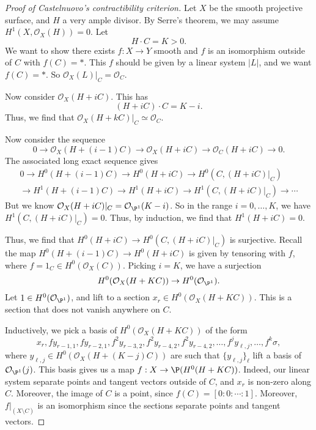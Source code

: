\documentclass[a4paper]{article}
\begin{document}
\begin{proof}[Proof of Castelnuovo's contractibility criterion]
  Let $X$ be the smooth projective surface, and $H$ a very ample divisor. By Serre's theorem, we may assume $H^1(X, \mathcal{O}_X(H)) = 0$. Let
  \[
    H \cdot C = K > 0.
  \]
  We want to show there exists $f: X \to Y$ smooth and $f$ is an isomorphism outside of $C$ with $f(C) = *$. This $f$ should be given by a linear system $|L|$, and we want $f(C) = *$. So $\mathcal{O}_X(L)|_C = \mathcal{O}_C$.

  Now consider $\mathcal{O}_X(H + iC)$. This has
  \[
    (H + iC) \cdot C = K - i.
  \]
  Thus, we find that $\mathcal{O}_X(H + kC)|_C \simeq \mathcal{O}_C$.

  Now consider the sequence
  \[
    0 \to \mathcal{O}_X (H + (i - 1) C) \to \mathcal{O}_X(H + iC) \to \mathcal{O}_C(H + iC) \to 0.
  \]
  The associated long exact sequence gives
  \begin{multline*}
    0 \to H^0(H + (i - 1)C) \to H^0(H + iC) \to H^0(C, (H + iC)|_C)\\
    \to H^1(H + (i - 1)C) \to H^1(H + iC) \to H^1(C, (H + iC)|_C) \to \cdots
  \end{multline*}
  But we know $\mathcal{O}_X(H + iC)|_C = \mathcal{O}_{\P^1}(K - i)$. So in the range $i = 0, \ldots, K$, we have $H^1(C, (H + iC)|_C) = 0$. Thus, by induction, we find that $H^1(H + iC) = 0$.

  Thus, we find that $H^0(H + iC) \to H^0(C, (H + iC)|_C)$ is surjective. Recall the map $H^0(H + (i - 1)C) \to H^0(H + iC)$ is given by tensoring with $f$, where $f = 1_C \in H^0(\mathcal{O}_X(C))$. Picking $i = K$, we have a surjection
  \[
    H^0(\mathcal{O}_X(H + KC)) \to H^0(\mathcal{O}_{\P^1}).
  \]
  Let $1 \in H^0(\mathcal{O}_{\P^1})$, and lift to a section $x_r \in H^0(\mathcal{O}_X(H + KC))$. This is a section that does not vanish anywhere on $C$.

  Inductively, we pick a basis of $H^0(\mathcal{O}_X(H + KC))$ of the form
  \[
    x_r, f y_{r - 1, 1}, f y_{r - 2, 1}, f^2 y_{r - 3, 2}, f^2 y_{r - 4, 2}, f^2 y_{r - 4, 2}, \ldots, f^j y_{\ell, j}, \ldots, f^k \sigma,
  \]
  where $y_{\ell, j} \in H^0(\mathcal{O}_X(H + (K - j)C))$ are such that $\{y_{\ell, j}\}_\ell$ lift a basis of $\mathcal{O}_{\P^1}(j)$. This basis gives us a map $f: X \to \P(H^0(H + KC))$. Indeed, our linear system separate points and tangent vectors outside of $C$, and $x_r$ is non-zero along $C$. Moreover, the image of $C$ is a point, since $f(C) = [0:0:\cdots :1]$. Moreover, $f|_{(X \setminus C)}$ is an isomorphism since the sections separate points and tangent vectors.


\end{proof}
\end{document}
